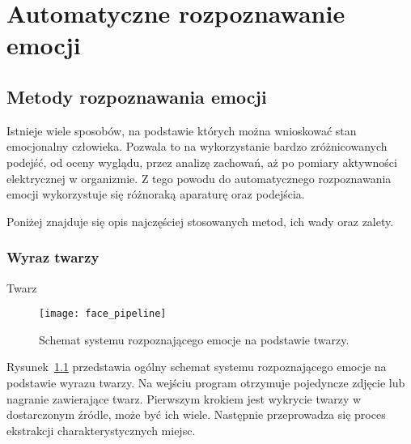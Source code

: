 \chapter{Automatyczne rozpoznawanie emocji}
\label{ch:automatyczne-rozpoznawanie-emocji}

\section{Metody rozpoznawania emocji}
\label{sec:metody-rozpoznawania-emocji}

Istnieje wiele sposobów, na podstawie których można wnioskować stan emocjonalny człowieka.
Pozwala to na wykorzystanie bardzo zróżnicowanych podejść, od oceny wyglądu, przez analizę zachowań, aż po pomiary aktywności elektrycznej w organizmie.
Z tego powodu do automatycznego rozpoznawania emocji wykorzystuje się różnoraką aparaturę oraz podejścia.

Poniżej znajduje się opis najczęściej stosowanych metod\cite{Varghese2015, Dzedzickis2020}, ich wady oraz zalety.

\subsection{Wyraz twarzy}\label{subsec:wyraz-twarzy}
Twarz

\begin{figure}[h]
    \centering
    \texttt{[image: face\_pipeline]}
    \caption{Schemat systemu rozpoznającego emocje na podstawie twarzy\cite{Ko2018}.}
    \label{fig:face-pipeline}
\end{figure}

Rysunek~\ref{fig:face-pipeline} przedstawia ogólny schemat systemu rozpoznającego emocje na podstawie wyrazu twarzy.
Na wejściu program otrzymuje pojedyncze zdjęcie lub nagranie zawierające twarz.
Pierwszym krokiem jest wykrycie twarzy w dostarczonym źródle, może być ich wiele.
Następnie przeprowadza się proces ekstrakcji charakterystycznych miejsc.
